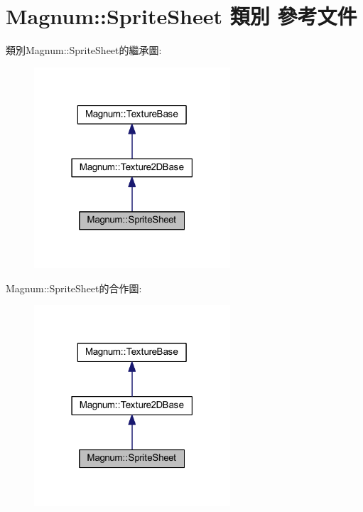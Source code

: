 \hypertarget{class_magnum_1_1_sprite_sheet}{}\section{Magnum\+:\+:Sprite\+Sheet 類別 參考文件}
\label{class_magnum_1_1_sprite_sheet}


類別\+Magnum\+:\+:Sprite\+Sheet的繼承圖\+:\nopagebreak
\begin{figure}[H]
\begin{center}
\leavevmode
\includegraphics[width=207pt]{class_magnum_1_1_sprite_sheet__inherit__graph}
\end{center}
\end{figure}


Magnum\+:\+:Sprite\+Sheet的合作圖\+:\nopagebreak
\begin{figure}[H]
\begin{center}
\leavevmode
\includegraphics[width=207pt]{class_magnum_1_1_sprite_sheet__coll__graph}
\end{center}
\end{figure}
